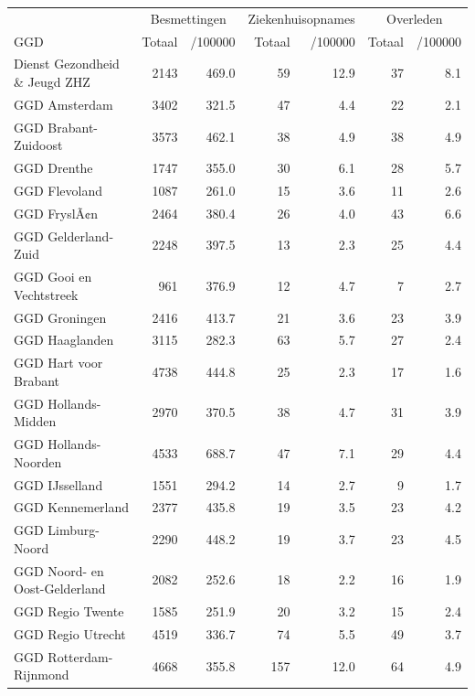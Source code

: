 \documentclass[
  english,
  man,floatsintext]{apa6}
\begin{document}
\begin{table}
\centering\begingroup\fontsize{10}{12}\selectfont

\begin{threeparttable}
\begin{tabular}{lrrrrrr}
\toprule
\multicolumn{1}{c}{ } & \multicolumn{2}{c}{Besmettingen} & \multicolumn{2}{c}{Ziekenhuisopnames} & \multicolumn{2}{c}{Overleden} \\
\cmidrule(l{3pt}r{3pt}){2-3} \cmidrule(l{3pt}r{3pt}){4-5} \cmidrule(l{3pt}r{3pt}){6-7}
GGD & Totaal & /100000 & Totaal & /100000 & Totaal & /100000\\
\midrule
Dienst Gezondheid \& Jeugd ZHZ & 2143 & 469.0 & 59 & 12.9 & 37 & 8.1\\
GGD Amsterdam & 3402 & 321.5 & 47 & 4.4 & 22 & 2.1\\
GGD Brabant-Zuidoost & 3573 & 462.1 & 38 & 4.9 & 38 & 4.9\\
GGD Drenthe & 1747 & 355.0 & 30 & 6.1 & 28 & 5.7\\
GGD Flevoland & 1087 & 261.0 & 15 & 3.6 & 11 & 2.6\\
GGD FryslÃ¢n & 2464 & 380.4 & 26 & 4.0 & 43 & 6.6\\
GGD Gelderland-Zuid & 2248 & 397.5 & 13 & 2.3 & 25 & 4.4\\
GGD Gooi en Vechtstreek & 961 & 376.9 & 12 & 4.7 & 7 & 2.7\\
GGD Groningen & 2416 & 413.7 & 21 & 3.6 & 23 & 3.9\\
GGD Haaglanden & 3115 & 282.3 & 63 & 5.7 & 27 & 2.4\\
GGD Hart voor Brabant & 4738 & 444.8 & 25 & 2.3 & 17 & 1.6\\
GGD Hollands-Midden & 2970 & 370.5 & 38 & 4.7 & 31 & 3.9\\
GGD Hollands-Noorden & 4533 & 688.7 & 47 & 7.1 & 29 & 4.4\\
GGD IJsselland & 1551 & 294.2 & 14 & 2.7 & 9 & 1.7\\
GGD Kennemerland & 2377 & 435.8 & 19 & 3.5 & 23 & 4.2\\
GGD Limburg-Noord & 2290 & 448.2 & 19 & 3.7 & 23 & 4.5\\
GGD Noord- en Oost-Gelderland & 2082 & 252.6 & 18 & 2.2 & 16 & 1.9\\
GGD Regio Twente & 1585 & 251.9 & 20 & 3.2 & 15 & 2.4\\
GGD Regio Utrecht & 4519 & 336.7 & 74 & 5.5 & 49 & 3.7\\
GGD Rotterdam-Rijnmond & 4668 & 355.8 & 157 & 12.0 & 64 & 4.9\\

\end{tabular}
\end{threeparttable}
\end{table}
\end{document}
